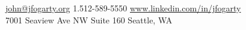 \documentclass[10pt,a4paper]{article}
\begin{document}
\sloppy  %



\nobreakvspace{0.3em}  %

\noindent\href{mailto:john.at.jfogarty.dot.org}{john\mbox{}@\mbox{}jfogarty.org}\sbull
\textsmaller{+}1.512-589-5550\sbull
\href{http://www.linkedin.com/in/jfogarty}{www.linkedin.com/in/jfogarty}
\\
7001 Seaview Ave NW\sbull
Suite 160\sbull
Seattle, WA

\spacedhrule{0.9em}{-0.4em}  %

\end{document}
